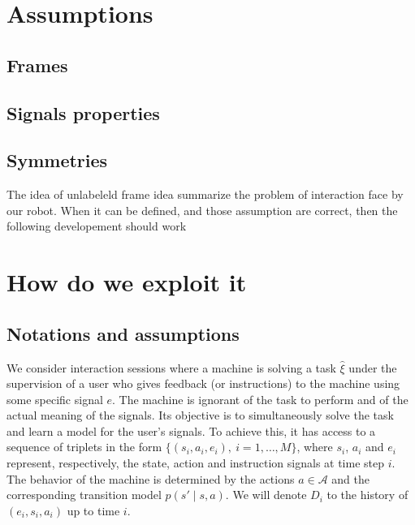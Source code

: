 \section{Assumptions}

\subsection{Frames}

\subsection{Signals properties}

\subsection{Symmetries}

The idea of unlabeleld frame idea summarize the problem of interaction face by our robot. When it can be defined, and those assumption are correct, then the following developement should work


\section{How do we exploit it}

\subsection{Notations and assumptions}

We consider interaction sessions where a machine is solving a task $\hat{\xi}$ under the supervision of a user who gives feedback (or instructions) to the machine using some specific signal $e$. The machine is ignorant of the task to perform and of the actual meaning of the signals. Its objective is to simultaneously solve the task and learn a model for the user's signals. To achieve this, it has access to a sequence of triplets in the form $\{(s_i, a_i, e_i),\ i = 1,\ldots,M\}$, where $s_i$, $a_i$ and $e_i$ represent, respectively, the state, action and instruction signals at time step $i$. The behavior of the machine is determined by the actions $a\in\mathcal{A}$ and the corresponding transition model $p(s'\mid s,a)$.  We will denote $D_i$ to the history of $(e_i, s_i, a_i)$ up to time $i$.


